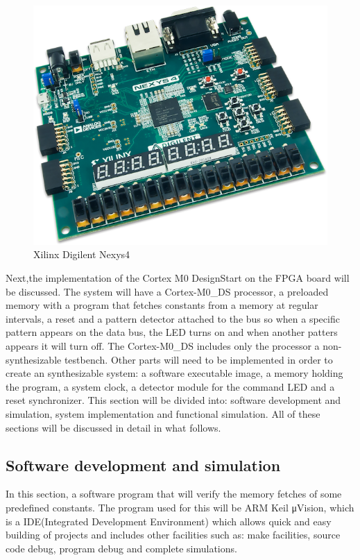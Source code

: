 \begin{figure}
\centering
\includegraphics[scale=0.7]{figures/nexys4.PNG}
\caption{Xilinx Digilent Nexys4 \label{fig:nexys4}}
\end{figure}

Next,the implementation of the Cortex M0 DesignStart on the FPGA board will be discussed. The system will have a Cortex-M0\_DS processor, a preloaded memory with a program that fetches constants from a memory at regular intervals, a reset and a pattern detector attached to the bus so when a specific pattern appears on the data bus, the LED turns on and when another patters appears it will turn off. The Cortex-M0\_DS  includes only the processor a non-synthesizable testbench. Other parts will need to be implemented in order to create an synthesizable system: a software executable image, a memory holding the program, a system clock, a detector module for the command LED and a reset synchronizer. This section will be divided into: software development and simulation, system implementation and functional simulation. All of these sections will be discussed in detail in what follows.

\subsection{Software development and simulation}
In this section, a software program that will verify the memory fetches of some predefined constants. The program used for this will be ARM Keil μVision, which is a IDE(Integrated Development Environment) which allows quick and easy building of projects and includes other facilities such as: make facilities, source code debug, program debug and complete simulations.

